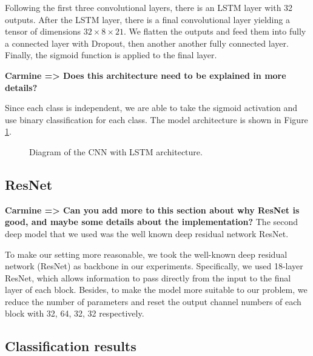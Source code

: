 \documentclass{article}
\newcommand{\carmine}[1]{\textbf{\color{red} Carmine => #1}}
\begin{document}
Following the first three convolutional layers, there is an LSTM layer with 32 outputs. After the LSTM layer, there is a final convolutional layer yielding a tensor of dimensions $32\times 8 \times 21$. We flatten the outputs and feed them into fully a connected layer with Dropout, then another another fully connected layer. Finally, the sigmoid function is applied to the final layer. 

\carmine{Does this architecture need to be explained in more details?}

Since each class is independent, we are able to take the sigmoid activation and use binary classification for each class. The model architecture is shown in Figure \ref{cnn_lstm}.

\begin{figure}
\caption{Diagram of the CNN with LSTM architecture. \label{cnn_lstm}}
\end{figure}


\subsection{ResNet}
\carmine{Can you add more to this section about why ResNet is good, and maybe some details about the implementation?}
The second deep model that we used was the well known deep residual network ResNet.

To make our setting more reasonable, we took the well-known deep residual network (ResNet) as backbone in our experiments. Specifically, we used 18-layer ResNet, which allows information to pass directly from the input to the final layer of each block. Besides, to make the model more suitable to our problem, we reduce the number of parameters and reset the output channel numbers of each block with 32, 64, 32, 32 respectively.

\subsection{Classification results}
\end{document}
